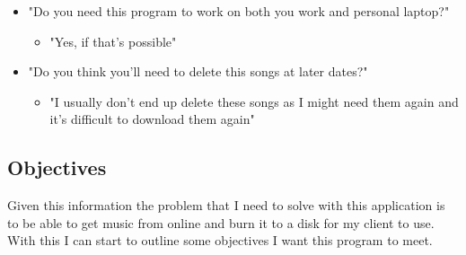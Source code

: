 \documentclass{article}
\begin{document}
\begin{itemize}
    \item "Do you need this program to work on both you work and personal laptop?"
    \begin{itemize}
        \item "Yes, if that's possible"
    \end{itemize}
    \item "Do you think you'll need to delete this songs at later dates?"
    \begin{itemize}
        \item "I usually don't end up delete these songs as I might need them again and it's difficult to
            download them again"
    \end{itemize}
\end{itemize}
\subsection{Objectives}\label{the-problem}
Given this information the problem that I need to solve with this
application is to be able to get music from online and burn it to a disk
for my client to use. With this I can start to outline some objectives I
want this program to meet.
\end{document}
